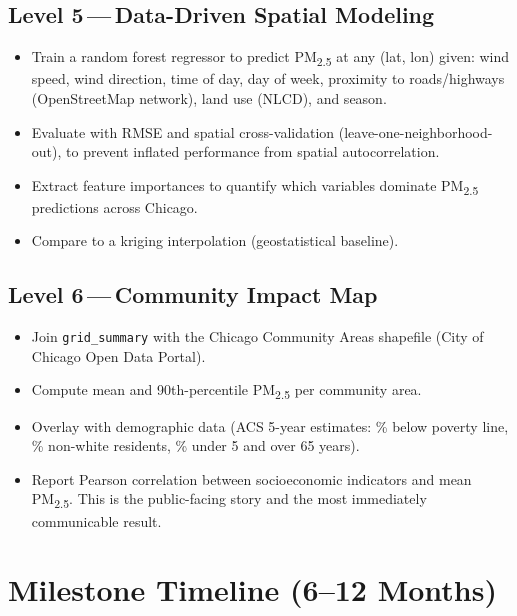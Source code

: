 \documentclass[11pt, letterpaper]{article}
\begin{document}
\subsection{Level 5\,---\,Data-Driven Spatial Modeling}
\begin{itemize}
  \item Train a random forest regressor to predict PM\textsubscript{2.5} at any (lat, lon) given: wind speed, wind direction, time of day, day of week, proximity to roads/highways (OpenStreetMap network), land use (NLCD), and season.
  \item Evaluate with RMSE and spatial cross-validation (leave-one-neighborhood-out), to prevent inflated performance from spatial autocorrelation.
  \item Extract feature importances to quantify which variables dominate PM\textsubscript{2.5} predictions across Chicago.
  \item Compare to a kriging interpolation (geostatistical baseline).
\end{itemize}

\subsection{Level 6\,---\,Community Impact Map}
\begin{itemize}
  \item Join \texttt{grid\_summary} with the Chicago Community Areas shapefile (City of Chicago Open Data Portal).
  \item Compute mean and 90th-percentile PM\textsubscript{2.5} per community area.
  \item Overlay with demographic data (ACS 5-year estimates: \% below poverty line, \% non-white residents, \% under 5 and over 65 years).
  \item Report Pearson correlation between socioeconomic indicators and mean PM\textsubscript{2.5}. This is the public-facing story and the most immediately communicable result.
\end{itemize}

\newpage

\section{Milestone Timeline (6--12 Months)}
\end{document}
